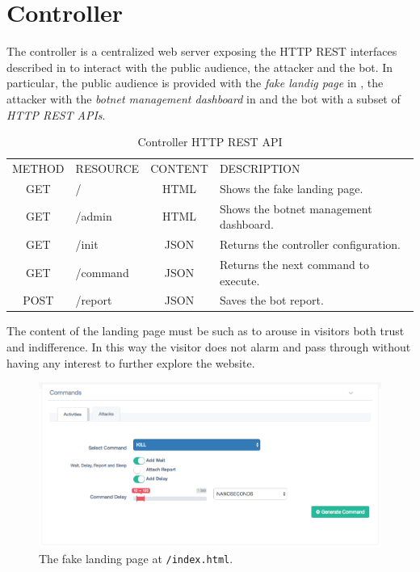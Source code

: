 \section{Controller}
\label{sec:controller}

The controller is a centralized web server exposing the HTTP REST interfaces  described in  to interact with the public audience, the attacker and the bot.
In particular, the public audience is provided with the \textit{fake landig page} in , the attacker with the  \textit{botnet management dashboard} in  and the bot with a subset of \textit{HTTP REST APIs}.

\begin{table}%
\caption{Controller HTTP REST API}
\label{tab:controller-rest}
\begin{minipage}{\columnwidth}
\begin{center}
\begin{tabular}{clcl}
  \toprule
  METHOD & RESOURCE & CONTENT & DESCRIPTION \\
  GET    & /        & HTML    & Shows the fake landing page. \\
  GET    & /admin   & HTML    & Shows the botnet management dashboard. \\
  GET    & /init    & JSON    & Returns the controller configuration.   \\
  GET    & /command & JSON    & Returns the next command to execute. \\
  POST   & /report  & JSON    & Saves the bot report. \\
  \bottomrule
\end{tabular}
\end{center}
\end{minipage}
\end{table}

The content of the landing page must be such as to arouse in visitors both trust and indifference. In this way the visitor does not alarm and pass through without having any interest to further explore the website.

\begin{figure}[tp]
  \centering
  \includegraphics[scale=0.2]{./fig/commandsWUI.png}
  \caption{The fake landing page at \texttt{/index.html}.}
    \label{fig:controller-fake-landingpage}
\end{figure}

